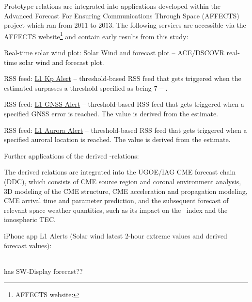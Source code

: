 Prototype \Kp{} relations are integrated into applications developed within the Advanced Forecast For Ensuring Communications Through Space (\mbox{AFFECTS}) project which ran from 2011 to 2013. The following services are accessible via the \mbox{AFFECTS} website\footnote{AFFECTS website: } and contain early results from this \Kp{} study:
\begin{itemize*}
	\item Real-time solar wind plot: \href{http://www.affects-fp7.eu/rssfeeds/ace_ap_forecast_plot/ace_realtime_ap_CH_GFT_plot.png}{Solar Wind and \Kp{} forecast plot} -- ACE/DSCOVR real-time solar wind and \Kp{} forecast plot.
	\item RSS feed: \href{http://www.affects-fp7.eu/rssfeeds/rssfeed_kp/rssfeed_kp.xml}{L1 Kp Alert} -- threshold-based RSS feed that gets triggered when the estimated \Kp{} surpasses a threshold specified as being $7-$.
	\item RSS feed: \href{http://www.affects-fp7.eu/rssfeeds/rssfeed_gnss/rssfeed_gnss.xml}{L1 GNSS Alert} -- threshold-based RSS feed that gets triggered when a specified GNSS error is reached. The value is derived from the \Kp{} estimate.
	\item RSS feed: \href{http://www.affects-fp7.eu/rssfeeds/rssfeed_aurora/rssfeed_aurora.xml}{L1 Aurora Alert} -- threshold-based RSS feed that gets triggered when a specified auroral location is reached. The value is derived from the \Kp{} estimate.
\end{itemize*}

\noindent Further applications of the derived \Kp{}-relations:
\begin{itemize*}
	\item The derived \Kp{} relations are integrated into the UGOE/IAG CME forecast chain (DDC), which consists of CME source region and coronal environment analysis, 3D modeling of the CME structure, CME acceleration and propagation modeling, CME arrival time and parameter prediction, and the subsequent forecast of relevant space weather quantities, such as its impact on the \Kp~index and the ionospheric TEC.
	\item iPhone app L1 Alerts (Solar wind latest 2-hour extreme values and derived forecast values):\\
	\\
	\item has SW-Display \Kp{} forecast??
\end{itemize*}



